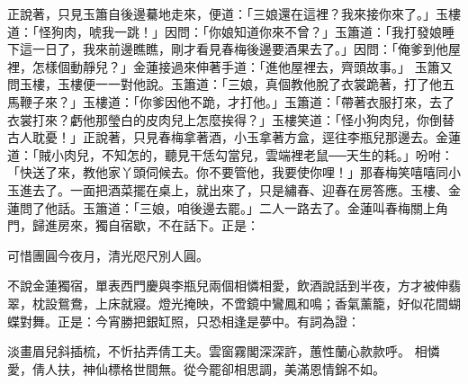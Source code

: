 正說著，只見玉簫自後邊驀地走來，便道：「三娘還在這裡？我來接你來了。」玉樓道：「怪狗肉，唬我一跳！」因問：「你娘知道你來不曾？」玉簫道：「我打發娘睡下這一日了，我來前邊瞧瞧，剛才看見春梅後邊要酒果去了。」因問：「俺爹到他屋裡，怎樣個動靜兒？」金蓮接過來伸著手道：「進他屋裡去，齊頭故事。」 玉簫又問玉樓，玉樓便一一對他說。玉簫道：「三娘，真個教他脫了衣裳跪著，打了他五馬鞭子來？」玉樓道：「你爹因他不跪，才打他。」玉簫道：「帶著衣服打來，去了衣裳打來？虧他那瑩白的皮肉兒上怎麼挨得？」玉樓笑道：「怪小狗肉兒，你倒替古人耽憂！」正說著，只見春梅拿著酒，小玉拿著方盒，逕往李瓶兒那邊去。金蓮道：「賊小肉兒，不知怎的，聽見干恁勾當兒，雲端裡老鼠──天生的耗。」吩咐：「快送了來，教他家丫頭伺候去。你不要管他，我要使你哩！」那春梅笑嘻嘻同小玉進去了。一面把酒菜擺在桌上，就出來了，只是繡春、迎春在房答應。玉樓、金蓮問了他話。玉簫道：「三娘，咱後邊去罷。」二人一路去了。金蓮叫春梅關上角門，歸進房來，獨自宿歇，不在話下。正是：

可惜團圓今夜月，清光咫尺別人圓。

不說金蓮獨宿，單表西門慶與李瓶兒兩個相憐相愛，飲酒說話到半夜，方才被伸翡翠，枕設鴛鴦，上床就寢。燈光掩映，不啻鏡中鸞鳳和鳴；香氣薰籠，好似花間蝴蝶對舞。正是：今宵勝把銀缸照，只恐相逢是夢中。有詞為證：

淡畫眉兒斜插梳，不忻拈弄倩工夫。雲窗霧閣深深許，蕙性蘭心款款呼。
相憐愛，倩人扶，神仙標格世間無。從今罷卻相思調，美滿恩情錦不如。

